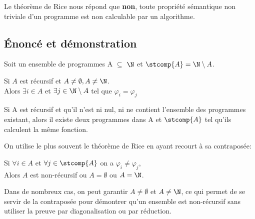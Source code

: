 Le théorème de Rice nous répond que \textbf{non}, toute propriété sémantique non triviale d'un programme est non calculable par un algorithme.

\subsection{Énoncé et démonstration}

Soit un ensemble de programmes A $\subseteq$ $\N$ et $\stcomp{A} = \N \setminus A$.

\begin{mytheo}[Rice]
	Si $A$ est récursif et $A\neq \emptyset, A \neq \N$. \\
	Alors $\exists i \in A$ et $\exists j \in \N \setminus A$ tel que $\varphi _i = \varphi _j$
	
	Si A est récursif et qu'il n'est ni nul, ni ne contient l'ensemble des programmes existant, alors il existe deux programmes dans A et $\stcomp{A}$ tel qu'ils calculent la même fonction. 
\end{mytheo}

On utilise le plus souvent le théorème de Rice en ayant recourt à sa contraposée:

\begin{mytheo}
	Si $\forall  i \in A$ et $\forall j \in \stcomp{A}$ on a $\varphi_i \neq \varphi_j$, \\
	Alors $A$ est non-récursif ou $A = \emptyset$ ou $A = \N$.
\end{mytheo}

Dans de nombreux cas, on peut garantir $A \neq \emptyset$ et $A \neq \N$, ce qui permet de se servir de la contraposée pour démontrer qu'un ensemble est non-récursif sans utiliser la preuve par diagonalisation ou par réduction.


